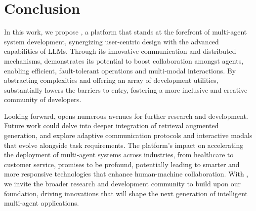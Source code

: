 \section{Conclusion}
\label{sec:conclusion}

In this work, we propose \ours, a platform that stands at the forefront of multi-agent system development, synergizing user-centric design with the advanced capabilities of LLMs. Through its innovative communication and distributed mechanisms, \ours demonstrates its potential to boost collaboration amongst agents, enabling efficient, fault-tolerant operations and multi-modal interactions. By abstracting complexities and offering an array of development utilities, \ours substantially lowers the barriers to entry, fostering a more inclusive and creative community of developers.

Looking forward, \ours opens numerous avenues for further research and development. Future work could delve into deeper integration of retrieval augmented generation, and explore adaptive communication protocols and interactive modals that evolve alongside task requirements. The platform's impact on accelerating the deployment of multi-agent systems across industries, from healthcare to customer service, promises to be profound, potentially leading to smarter and more responsive technologies that enhance human-machine collaboration.
With \ours, we invite the broader research and development community to build upon our foundation, driving innovations that will shape the next generation of intelligent multi-agent applications.
